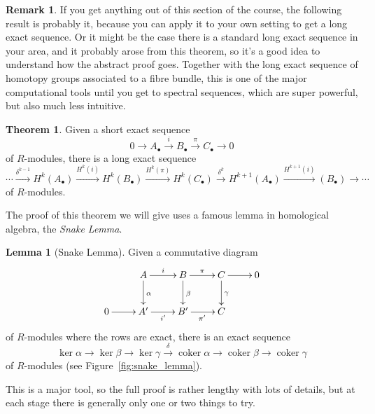 \documentclass{tufte-handout}
\DeclareMathOperator{\coker}{coker}
\theoremstyle{definition}
\newtheorem{lemma}{Lemma}
\newtheorem{theorem}{Theorem}
\newtheorem*{rem}{Remark}
\begin{document}
\begin{rem}
If you get anything out of this section of the course, the following result is probably 
it, because you can apply it to your own setting to get a long exact sequence. Or it 
might be the case there is a standard long exact sequence in your area, and it 
probably arose from this theorem, so it's a good idea to understand how the abstract 
proof goes. Together with the long exact sequence of homotopy groups associated to a 
fibre bundle, this is one of the major computational tools until you get to spectral 
sequences, which are super powerful, but also much less intuitive.
\end{rem}

\begin{theorem}\label{thm:alg_Mayer-Vietoris}
Given a short exact sequence 
\[
        0\to A_\bullet \xrightarrow{i} B_\bullet \xrightarrow{\pi} C_\bullet \to 0
\]
of $R$-modules, there is a long exact sequence
\[
\cdots \xrightarrow{\delta^{k-1}} H^k(A_\bullet) \xrightarrow{H^k(i)} H^k(B_\bullet) \xrightarrow{H^k(\pi)} H^k(C_\bullet)
\xrightarrow{\delta^k} H^{k+1}(A_\bullet) \xrightarrow{H^{k+1}(i)} (B_\bullet) \to \cdots
\]
of $R$-modules.
\end{theorem}

The proof of this theorem we will give uses a famous lemma in homological algebra, the \emph{Snake 
Lemma}.

\begin{lemma}[Snake Lemma]
\label{snakeLemma}
Given a commutative diagram 
\[
	\xymatrix{
	& A \ar[r]^i \ar[d]^\alpha & B \ar[r]^\pi \ar[d]^\beta & C \ar[r] \ar[d]^\gamma & 0 \\
	0\ar[r] & A' \ar[r]_{i'} & B' \ar[r]_{\pi'} & C
	}
\]
of $R$-modules where the rows are exact, there is an exact sequence
\[
	\ker\alpha \to \ker\beta \to \ker\gamma \xrightarrow{\delta} \coker\alpha 
	\to \coker\beta \to \coker\gamma
\]
of $R$-modules (see Figure~\ref{fig:snake_lemma}).
\end{lemma}

This is a major tool, so the full proof is rather lengthy with lots of details, but at each stage there is generally
only one or two things to try.
\end{document}
